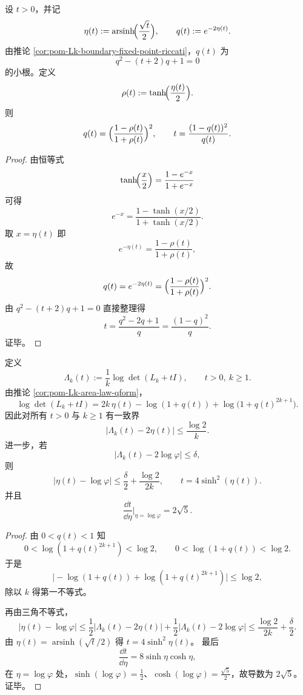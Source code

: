 \begin{theorem}\label{thm:conclusion-riccati-double-cayley-exact-isomorphism}
设 \(t>0\)，并记
\[
\eta(t):=\operatorname{arsinh}\!\Bigl(\frac{\sqrt t}{2}\Bigr),
\qquad
q(t):=e^{-2\eta(t)}.
\]
由推论 \ref{cor:pom-Lk-boundary-fixed-point-riccati}，\(q(t)\) 为
\[
q^2-(t+2)q+1=0
\]
的小根。定义
\[
\rho(t):=\tanh\!\Bigl(\frac{\eta(t)}{2}\Bigr).
\]
则
\[
q(t)=\Bigl(\frac{1-\rho(t)}{1+\rho(t)}\Bigr)^2,
\qquad
t=\frac{(1-q(t))^2}{q(t)}.
\]
\end{theorem}
\begin{proof}
由恒等式
\[
\tanh\!\Bigl(\frac{x}{2}\Bigr)=\frac{1-e^{-x}}{1+e^{-x}}
\]
可得
\[
e^{-x}=\frac{1-\tanh(x/2)}{1+\tanh(x/2)}.
\]
取 \(x=\eta(t)\) 即
\[
e^{-\eta(t)}=\frac{1-\rho(t)}{1+\rho(t)},
\]
故
\[
q(t)=e^{-2\eta(t)}
=\Bigl(\frac{1-\rho(t)}{1+\rho(t)}\Bigr)^2.
\]
由 \(q^2-(t+2)q+1=0\) 直接整理得
\[
t=\frac{q^2-2q+1}{q}=\frac{(1-q)^2}{q}.
\]
证毕。
\end{proof}



\begin{theorem}[黄金耦合的有限尺寸刚性与参数反演界]\label{thm:conclusion-golden-coupling-finite-k-rigidity}
定义
\[
\Lambda_k(t):=\frac1k\log\det(L_k+tI),\qquad t>0,\ k\ge 1.
\]
由推论 \ref{cor:pom-Lk-area-law-qform}，
\[
\log\det(L_k+tI)
=2k\,\eta(t)-\log(1+q(t))+\log\!\bigl(1+q(t)^{2k+1}\bigr).
\]
因此对所有 \(t>0\) 与 \(k\ge 1\) 有一致界
\[
\bigl|\Lambda_k(t)-2\eta(t)\bigr|\le \frac{\log 2}{k}.
\]
进一步，若
\[
\bigl|\Lambda_k(t)-2\log\varphi\bigr|\le \delta,
\]
则
\[
|\eta(t)-\log\varphi|
\le
\frac{\delta}{2}+\frac{\log 2}{2k},
\qquad
t=4\sinh^2(\eta(t)).
\]
并且
\[
\frac{\dd t}{\dd\eta}\Big|_{\eta=\log\varphi}=2\sqrt5.
\]
\end{theorem}
\begin{proof}
由 \(0<q(t)<1\) 知
\[
0<\log(1+q(t)^{2k+1})<\log 2,\qquad
0<\log(1+q(t))<\log 2.
\]
于是
\[
\bigl|-\log(1+q(t))+\log(1+q(t)^{2k+1})\bigr|\le \log 2,
\]
除以 \(k\) 得第一不等式。

再由三角不等式，
\[
|\eta(t)-\log\varphi|
\le
\frac12|\Lambda_k(t)-2\eta(t)|+\frac12|\Lambda_k(t)-2\log\varphi|
\le
\frac{\log 2}{2k}+\frac{\delta}{2}.
\]
由 \(\eta(t)=\operatorname{arsinh}(\sqrt t/2)\) 得 \(t=4\sinh^2\eta(t)\)。
最后
\[
\frac{\dd t}{\dd\eta}=8\sinh\eta\cosh\eta,
\]
在 \(\eta=\log\varphi\) 处，\(\sinh(\log\varphi)=\frac12\)、\(\cosh(\log\varphi)=\frac{\sqrt5}{2}\)，故导数为 \(2\sqrt5\)。证毕。
\end{proof}

